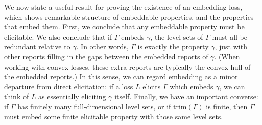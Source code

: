 \documentclass[11pt]{article}
\newcommand{\trim}{\mathrm{trim}}
\begin{document}
We now state a useful result for proving the existence of an embedding loss, which shows remarkable structure of embeddable properties, and the properties that embed them.
First, we conclude that any embeddable property must be elicitable.
We also conclude that if $\Gamma$ embeds $\gamma$, the level sets of $\Gamma$ must all be redundant relative to $\gamma$.
In other words, $\Gamma$ is exactly the property $\gamma$, just with other reports filling in the gaps between the embedded reports of $\gamma$.
(When working with convex losses, these extra reports are typically the convex hull of the embedded reports.)
In this sense, we can regard embedding as a minor departure from direct elicitation: if a loss $L$ elicits $\Gamma$ which embeds $\gamma$, we can think of $L$ as essentially eliciting $\gamma$ itself.
Finally, we have an important converse: if $\Gamma$ has finitely many full-dimensional level sets, or if $\trim(\Gamma)$ is finite, then $\Gamma$ must embed some finite elicitable property with those same level sets.
\end{document}
